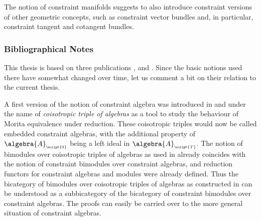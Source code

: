 \documentclass{memoir}
\newcommand{\Total}{{\scriptscriptstyle\script{T}}}
\newcommand{\Null}{{\scriptscriptstyle\script{0}}}
\begin{document}
The notion of constraint manifolds suggests to also introduce constraint versions of other geometric concepts,
such as constraint vector bundles and, in particular, constraint tangent and cotangent bundles. 



\subsubsection*{Bibliographical Notes}

This thesis is based on three publications \cite{dippell.esposito.waldmann:2019a}, \cite{dippell.menke.waldmann:2022a}
and \cite{dippell.esposito.waldmann:2022a}.
Since the basic notions used there have somewhat changed over time, let us comment a bit on their relation to the current thesis.

A first version of the notion of constraint algebra was introduced in \cite{dippell:2018a} and \cite{dippell.esposito.waldmann:2019a}
under the name of \emph{coisotropic triple of algebras} as a tool to study the behaviour of Morita equivalence under reduction.
These coisotropic triples would now be called embedded constraint algebras, with the additional property of
$\algebra{A}_\Null$ being a left ideal in $\algebra{A}_\Total$.
The notion of bimodules over coisotropic triples of algebras as used in
\cite{dippell.esposito.waldmann:2019a} already coincides with the notion of constraint bimodules over constraint algebras,
and reduction functors for constraint algebras and modules were already defined.
Thus the bicategory of bimodules over coisotropic triples of algebras as constructed in
\cite{dippell.esposito.waldmann:2019a} can be understood as a subbicategory of the bicategory of constraint bimodules over constraint algebras.
The proofs can easily be carried over to the more general situation of constraint algebras.
\end{document}
